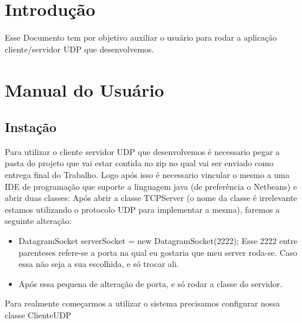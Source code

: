 \documentclass{abnt}
\begin{document}






\capa

\folhaderosto

\tableofcontents


\chapter{Introdução}
Esse Documento tem por objetivo auxiliar o usuário para rodar a aplicação cliente/servidor UDP que desenvolvemos.

\clearpage
\chapter{Manual do Usuário}

	\section{Instação}	
	Para utilizar o cliente servidor UDP que desenvolvemos é necessario pegar a pasta do projeto que vai estar contida no zip no qual vai ser enviado como entrega final do Trabalho. Logo após isso é necessario vincular o mesmo a uma IDE de programação que suporte a linguagem java (de preferência o Netbeans) e abrir duas classes:
	Após abrir a classe TCPServer (o nome da classe é irrelevante estamos utilizando o protocolo UDP para implementar a mesma), faremos a seguinte alteração:
		\begin{itemize}
			\item DatagramSocket serverSocket = new DatagramSocket(2222); Esse 2222 entre parenteses refere-se a porta na qual eu gostaria que meu server roda-se. Caso essa não seja a sua escolhida, e só trocar ali.
			\item Após essa pequena de alteração de porta, e só rodar a classe do servidor.
		\end{itemize}	
	Para realmente começarmos a utilizar o sistema precisamos configurar nossa classe ClienteUDP	
	
\end{document}
